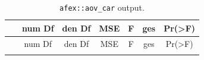 \documentclass[]{article}
\theoremstyle{definition}
\theoremstyle{definition}
\theoremstyle{definition}
\theoremstyle{remark}
\begin{document}
\begin{longtable}[]{@{}ccccccc@{}}
\caption{\texttt{afex::aov\_car} output.}\tabularnewline
\toprule
\begin{minipage}[b]{0.23\columnwidth}\centering\strut
~\strut
\end{minipage} & \begin{minipage}[b]{0.10\columnwidth}\centering\strut
num Df\strut
\end{minipage} & \begin{minipage}[b]{0.10\columnwidth}\centering\strut
den Df\strut
\end{minipage} & \begin{minipage}[b]{0.09\columnwidth}\centering\strut
MSE\strut
\end{minipage} & \begin{minipage}[b]{0.09\columnwidth}\centering\strut
F\strut
\end{minipage} & \begin{minipage}[b]{0.10\columnwidth}\centering\strut
ges\strut
\end{minipage} & \begin{minipage}[b]{0.12\columnwidth}\centering\strut
Pr(\textgreater{}F)\strut
\end{minipage}\tabularnewline
\midrule
\endfirsthead
\toprule
\begin{minipage}[b]{0.23\columnwidth}\centering\strut
~\strut
\end{minipage} & \begin{minipage}[b]{0.10\columnwidth}\centering\strut
num Df\strut
\end{minipage} & \begin{minipage}[b]{0.10\columnwidth}\centering\strut
den Df\strut
\end{minipage} & \begin{minipage}[b]{0.09\columnwidth}\centering\strut
MSE\strut
\end{minipage} & \begin{minipage}[b]{0.09\columnwidth}\centering\strut
F\strut
\end{minipage} & \begin{minipage}[b]{0.10\columnwidth}\centering\strut
ges\strut
\end{minipage} & \begin{minipage}[b]{0.12\columnwidth}\centering\strut
Pr(\textgreater{}F)\strut
\end{minipage}\tabularnewline
\midrule
\endhead
\begin{minipage}[t]{0.23\columnwidth}\centering\strut

\end{minipage}
\end{longtable}
\end{document}

